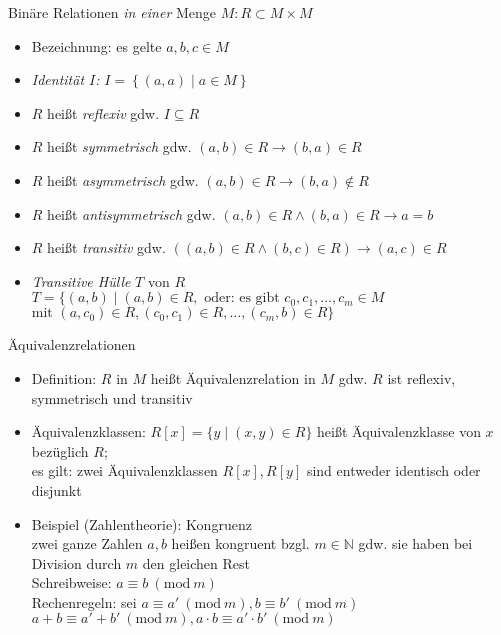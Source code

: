 \begin{frame}{Binäre Relationen \emph{in einer} Menge $M: R \subset M \times M$}
	\begin{itemize}
		\item Bezeichnung: es gelte $a,b,c \in M$
		\item \emph{Identität $I$:} $I=\left\{(a,a) \mid a \in M\right\}$
		\item $R$ heißt \emph{reflexiv} gdw. $I \subseteq R$
		\item $R$ heißt \emph{symmetrisch} gdw. $(a,b) \in R \rightarrow (b,a) \in R$
		\item $R$ heißt \emph{asymmetrisch} gdw. $(a,b) \in R \rightarrow (b,a) \notin R$
		\item $R$ heißt \emph{antisymmetrisch} gdw. $(a,b) \in R \land (b,a) \in R \rightarrow a = b$
		\item $R$ heißt \emph{transitiv} gdw. $((a,b) \in R \land (b,c) \in R) \rightarrow (a,c) \in R$
		\item \emph{Transitive Hülle} $T$ von $R$\\
			$T=\{(a,b) \mid (a,b) \in R, \textrm{ oder: es gibt } c_0, c_1, \ldots, c_m \in M$\\
			$\textrm{mit } (a,c_0) \in R, (c_0, c_1) \in R, \ldots, (c_m,b) \in R\}$
	\end{itemize}
\end{frame}

\begin{frame}{Äquivalenzrelationen}
	\begin{itemize}
		\item Definition: $R$ in $M$ heißt Äquivalenzrelation in $M$ gdw. $R$ ist reflexiv, symmetrisch und transitiv
		\item Äquivalenzklassen: $R[x]=\{y \mid (x,y) \in R\}$ heißt Äquivalenzklasse von $x$ bezüglich $R$;\\
			es gilt: zwei Äquivalenzklassen $R[x], R[y]$ sind entweder identisch oder disjunkt
		\item Beispiel (Zahlentheorie): Kongruenz\\
			zwei ganze Zahlen $a,b$ heißen kongruent bzgl. $m \in \mathbb{N}$ gdw. sie haben bei Division durch $m$ den gleichen Rest\\
			Schreibweise: $a \equiv b\ (\mathrm{mod}\ m)$\\
			Rechenregeln: sei $a \equiv a'\ (\mathrm{mod}\ m), b \equiv b'\ (\mathrm{mod}\ m)$\\
			$a+b\equiv a'+b'\ (\mathrm{mod}\ m), a \cdot b \equiv a' \cdot b'\ (\mathrm{mod}\ m)$
	\end{itemize}
\end{frame}

